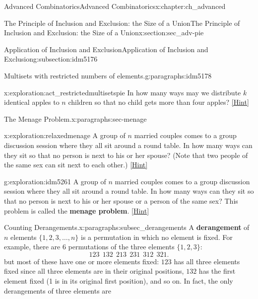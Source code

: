 \documentclass[oneside,10pt,]{book}
\newcommand{\terminology}[1]{\textbf{#1}}
\numberwithin{equation}{chapter}
\begin{document}
\begin{chapterptx}{Advanced Combinatorics}{}{Advanced Combinatorics}{}{}{x:chapter:ch_advanced}
\begin{sectionptx}{The Principle of Inclusion and Exclusion: the Size of a Union}{}{The Principle of Inclusion and Exclusion: the Size of a Union}{}{}{x:section:sec_adv-pie}
\begin{subsectionptx}{Application of Inclusion and Exclusion}{}{Application of Inclusion and Exclusion}{}{}{g:subsection:idm5176}
\begin{paragraphs}{Multisets with restricted numbers of elements.}{g:paragraphs:idm5178}%
\begin{exploration}{}{x:exploration:act_restrictedmultisetspie}%
In how many ways may we distribute \(k\) identical apples to \(n\) children so that no child gets more than four apples?%
\space\hspace*{0pt}\hfill{\tiny\hyperlink{g:hint:idm5185-back}{[Hint]}}\end{exploration}
\end{paragraphs}%
\begin{paragraphs}{The Menage Problem.}{x:paragraphs:sec-menage}%
\begin{exploration}{}{x:exploration:relaxedmenage}%
A group of \(n\) married couples comes to a group discussion session where they all sit around a round table. In how many ways can they sit so that no person is next to his or her spouse? (Note that two people of the same sex can sit next to each other.)%
\space\hspace*{0pt}\hfill{\tiny\hyperlink{g:hint:idm5229-back}{[Hint]}}\end{exploration}
\begin{exploration}{}{g:exploration:idm5261}%
A group of \(n\) married couples comes to a group discussion session where they all sit around a round table. In how many ways can they sit so that no person is next to his or her spouse or a person of the same sex? This problem is called the \terminology{menage problem}.%
\space\hspace*{0pt}\hfill{\tiny\hyperlink{g:hint:idm5268-back}{[Hint]}}\end{exploration}
\end{paragraphs}%
\begin{paragraphs}{Counting Derangements.}{x:paragraphs:subsec_derangements}%
A \terminology{derangement} of \(n\) elements \(\{1,2,3,\ldots, n\}\) is a permutation in which no element is fixed. For example, there are \(6\) permutations of the three elements \(\{1,2,3\}\):%
\begin{equation*}
123 ~~ 132 ~~ 213 ~~ 231 ~~ 312 ~~ 321.
\end{equation*}
but most of these have one or more elements fixed: \(123\) has all three elements fixed since all three elements are in their original positions, \(132\) has the first element fixed (1 is in its original first position), and so on. In fact, the only derangements of three elements are%
\begin{equation*}

\end{equation*}
\end{paragraphs}
\end{subsectionptx}
\end{sectionptx}
\end{chapterptx}
\end{document}
